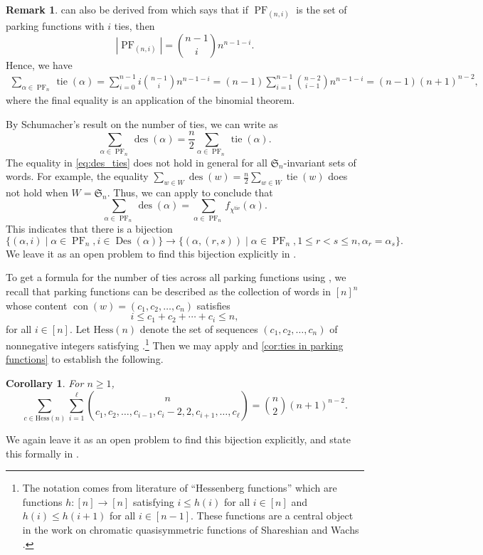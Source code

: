 \documentclass{amsart}
\renewcommand{\S}{\mathfrak{S}}
\DeclareMathOperator{\des}{des}
\DeclareMathOperator{\Des}{Des}
\DeclareMathOperator{\tie}{tie}
\DeclareMathOperator{\PF}{PF}
\DeclareMathOperator{\con}{con}
\newtheorem{corollary}[theorem]{Corollary}
\theoremstyle{definition}
\newtheorem{remark}[theorem]{Remark}
\begin{document}
    \begin{remark} can also be derived from \cite[Theorem 13]{bib:DescentsInPF} which says that if  $\PF_{(n,i)}$ is the set of parking functions with $i$ ties, then
    \[|\PF_{(n,i)}|=\binom{n-1}{i}n^{n-1-i}.\]
    Hence, we have
    \begin{align*}
        \sum_{\alpha\in \PF_n}\tie(\alpha)
        =\sum_{i=0}^{n-1}i\binom{n-1}{i}n^{n-1-i}
        =(n-1)\sum_{i=1}^{n-1}\binom{n-2}{i-1}n^{n-1-i}
        =(n-1)(n+1)^{n-2}, 
    \end{align*}
    where the final equality is an application of the binomial theorem.\end{remark}

    By Schumacher's result on the number of ties, we can write  as
    \begin{equation}\label{eq:des_ties}\sum_{\alpha\in \PF_n}\des(\alpha)=\frac{n}{2}\sum_{\alpha\in \PF_n}\tie(\alpha).\end{equation}
    The equality in \eqref{eq:des_ties} does not hold in general for all $\S_n$-invariant sets of words. 
    For example, the  equality $\sum_{w\in W} \des(w)=\frac{n}{2}\sum_{w\in W}\tie(w)$ does not hold when $W=\S_n$.
    Thus, we can apply  to conclude that
    \[\sum_{\alpha\in \PF_n}\des(\alpha)=\sum_{\alpha\in \PF_n}f_{\chi^{\tie}}(\alpha).\]
    This indicates that there is a bijection
    \[\{(\alpha,i)\mid \alpha\in \PF_n, i\in \Des(\alpha)\}\to \{(\alpha,(r,s))\mid \alpha\in \PF_n, 1\leq r<s\leq n, \alpha_r=\alpha_s\}.\]
    We leave it as an open problem to find this bijection explicitly in .
    
 To get a formula for the number of ties across all parking functions using , we recall that  parking functions can be described as the collection of words in $[n]^n$ whose content $\con(w)=(c_1,c_2,\dots,c_n)$ satisfies
    \begin{equation}\label{eq:Hess}
    i\leq c_1+c_2+\cdots+c_i\leq n,
    \end{equation}
    for all $i\in [n]$.
    Let $\mathrm{Hess}(n)$ denote the set of sequences $(c_1,c_2,\dots,c_n)$ of nonnegative integers satisfying .\footnote{The notation comes from literature of ``Hessenberg functions'' which are functions $h:[n]\to [n]$ satisfying $i\leq h(i)$ for all $i\in [n]$ and $h(i)\leq h(i+1)$ for all $i\in [n-1]$.
    These functions are a central object in the work on chromatic quasisymmetric functions of Shareshian and Wachs \cite{shareshian_chromatic_2016}.} 
    Then we may apply  and \ref{cor:ties in parking functions} to establish the following.
    \begin{corollary}\label{cor:mystery of parking function ties}
    For $n\geq 1$,
         \[\sum_{c\in \mathrm{Hess}(n)}\sum_{i=1}^\ell \binom{n}{c_1,c_2,\dots,c_{i-1},c_i-2,2,c_{i+1},\dots,c_\ell}=\binom{n}{2}(n+1)^{n-2}.\]
    \end{corollary}
    We again leave it as an open problem to find this bijection explicitly, and state this formally in .
\end{document}
